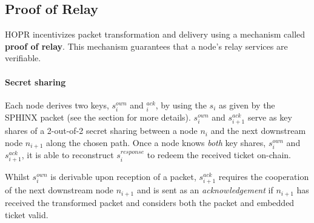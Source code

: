 \subsection{Proof of Relay}
\label{sec:incentives:proofofrelay}

HOPR incentivizes packet transformation and delivery using a mechanism called \textbf{proof of relay}. This mechanism guarantees that a node's relay services are verifiable.

\paragraph{Secret sharing}
\label{sec:incentives:proofofrelay:secretSharing}

Each node derives two keys, $s_i^{own}$ and $_i^{ack}$, by using the $s_i$ as given by the SPHINX packet (see the  section for more details). $s_i^{own}$ and $s_{i+1}^{ack}$ serve as key shares of a 2-out-of-2 secret sharing between a node $n_i$ and the next downstream node $n_{i+1}$ along the chosen path. Once a node knows \textit{both} key shares, $s_i^{own}$ and $s_{i+1}^{ack}$, it is able to reconstruct $s_i^{response}$ to redeem the received ticket on-chain.

Whilst $s_i^{own}$ is derivable upon reception of a packet, $s_{i+1}^{ack}$ requires the cooperation of the next downstream node $n_{i+1}$ and is sent as an \textit{acknowledgement} if $n_{i+1}$ has received the transformed packet and considers both the packet and embedded ticket valid.

